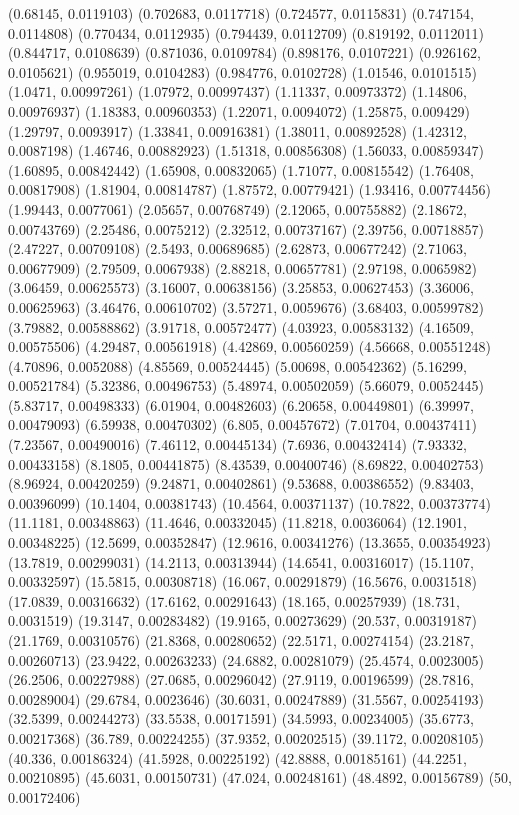 {(0.68145, 0.0119103)
(0.702683, 0.0117718)
(0.724577, 0.0115831)
(0.747154, 0.0114808)
(0.770434, 0.0112935)
(0.794439, 0.0112709)
(0.819192, 0.0112011)
(0.844717, 0.0108639)
(0.871036, 0.0109784)
(0.898176, 0.0107221)
(0.926162, 0.0105621)
(0.955019, 0.0104283)
(0.984776, 0.0102728)
(1.01546, 0.0101515)
(1.0471, 0.00997261)
(1.07972, 0.00997437)
(1.11337, 0.00973372)
(1.14806, 0.00976937)
(1.18383, 0.00960353)
(1.22071, 0.0094072)
(1.25875, 0.009429)
(1.29797, 0.0093917)
(1.33841, 0.00916381)
(1.38011, 0.00892528)
(1.42312, 0.0087198)
(1.46746, 0.00882923)
(1.51318, 0.00856308)
(1.56033, 0.00859347)
(1.60895, 0.00842442)
(1.65908, 0.00832065)
(1.71077, 0.00815542)
(1.76408, 0.00817908)
(1.81904, 0.00814787)
(1.87572, 0.00779421)
(1.93416, 0.00774456)
(1.99443, 0.0077061)
(2.05657, 0.00768749)
(2.12065, 0.00755882)
(2.18672, 0.00743769)
(2.25486, 0.0075212)
(2.32512, 0.00737167)
(2.39756, 0.00718857)
(2.47227, 0.00709108)
(2.5493, 0.00689685)
(2.62873, 0.00677242)
(2.71063, 0.00677909)
(2.79509, 0.0067938)
(2.88218, 0.00657781)
(2.97198, 0.0065982)
(3.06459, 0.00625573)
(3.16007, 0.00638156)
(3.25853, 0.00627453)
(3.36006, 0.00625963)
(3.46476, 0.00610702)
(3.57271, 0.0059676)
(3.68403, 0.00599782)
(3.79882, 0.00588862)
(3.91718, 0.00572477)
(4.03923, 0.00583132)
(4.16509, 0.00575506)
(4.29487, 0.00561918)
(4.42869, 0.00560259)
(4.56668, 0.00551248)
(4.70896, 0.0052088)
(4.85569, 0.00524445)
(5.00698, 0.00542362)
(5.16299, 0.00521784)
(5.32386, 0.00496753)
(5.48974, 0.00502059)
(5.66079, 0.0052445)
(5.83717, 0.00498333)
(6.01904, 0.00482603)
(6.20658, 0.00449801)
(6.39997, 0.00479093)
(6.59938, 0.00470302)
(6.805, 0.00457672)
(7.01704, 0.00437411)
(7.23567, 0.00490016)
(7.46112, 0.00445134)
(7.6936, 0.00432414)
(7.93332, 0.00433158)
(8.1805, 0.00441875)
(8.43539, 0.00400746)
(8.69822, 0.00402753)
(8.96924, 0.00420259)
(9.24871, 0.00402861)
(9.53688, 0.00386552)
(9.83403, 0.00396099)
(10.1404, 0.00381743)
(10.4564, 0.00371137)
(10.7822, 0.00373774)
(11.1181, 0.00348863)
(11.4646, 0.00332045)
(11.8218, 0.0036064)
(12.1901, 0.00348225)
(12.5699, 0.00352847)
(12.9616, 0.00341276)
(13.3655, 0.00354923)
(13.7819, 0.00299031)
(14.2113, 0.00313944)
(14.6541, 0.00316017)
(15.1107, 0.00332597)
(15.5815, 0.00308718)
(16.067, 0.00291879)
(16.5676, 0.0031518)
(17.0839, 0.00316632)
(17.6162, 0.00291643)
(18.165, 0.00257939)
(18.731, 0.0031519)
(19.3147, 0.00283482)
(19.9165, 0.00273629)
(20.537, 0.00319187)
(21.1769, 0.00310576)
(21.8368, 0.00280652)
(22.5171, 0.00274154)
(23.2187, 0.00260713)
(23.9422, 0.00263233)
(24.6882, 0.00281079)
(25.4574, 0.0023005)
(26.2506, 0.00227988)
(27.0685, 0.00296042)
(27.9119, 0.00196599)
(28.7816, 0.00289004)
(29.6784, 0.0023646)
(30.6031, 0.00247889)
(31.5567, 0.00254193)
(32.5399, 0.00244273)
(33.5538, 0.00171591)
(34.5993, 0.00234005)
(35.6773, 0.00217368)
(36.789, 0.00224255)
(37.9352, 0.00202515)
(39.1172, 0.00208105)
(40.336, 0.00186324)
(41.5928, 0.00225192)
(42.8888, 0.00185161)
(44.2251, 0.00210895)
(45.6031, 0.00150731)
(47.024, 0.00248161)
(48.4892, 0.00156789)
(50, 0.00172406)
}

